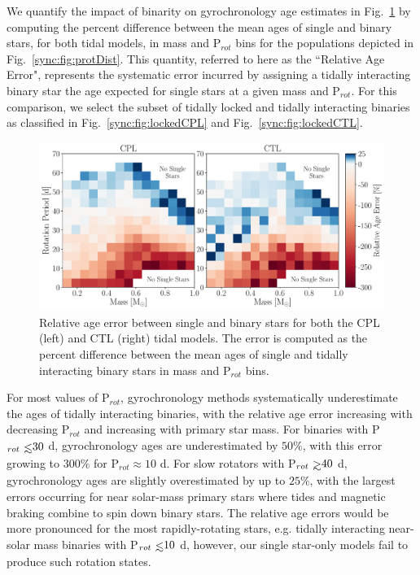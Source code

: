 We quantify the impact of binarity on gyrochronology age estimates in Fig.~\ref{sync:fig:gyro} by computing the percent difference between the mean ages of single and binary stars, for both tidal models, in mass and P$_{rot}$ bins for the populations depicted in Fig.~\ref{sync:fig:protDist}. This quantity, referred to here as the ``Relative Age Error", represents the systematic error incurred by assigning a tidally interacting binary star the age expected for single stars at a given mass and P$_{rot}$. For this comparison, we select the subset of tidally locked and tidally interacting binaries as classified in Fig.~\ref{sync:fig:lockedCPL} and Fig.~\ref{sync:fig:lockedCTL}. 

\begin{figure}
	\includegraphics[width=\columnwidth]{gyro.pdf}
   \caption{Relative age error between single and binary stars for both the CPL (left) and CTL (right) tidal models. The error is computed as the percent difference between the mean ages of single and tidally interacting binary stars in mass and P$_{rot}$ bins.}%
    \label{sync:fig:gyro}%
\end{figure}

For most values of P$_{rot}$, gyrochronology methods systematically underestimate the ages of tidally interacting binaries, with the relative age error increasing with decreasing P$_{rot}$ and increasing with primary star mass. For binaries with P$_{rot} \lsim 30$ d, gyrochronology ages are underestimated by $50\%$, with this error growing to $300\%$ for P$_{rot} \approx 10$ d. For slow rotators with P$_{rot} \gsim 40$ d, gyrochronology ages are slightly overestimated by up to $25\%$, with the largest errors occurring for near solar-mass primary stars where tides and magnetic braking combine to spin down binary stars.  The relative age errors would be more pronounced for the most rapidly-rotating stars, e.g. tidally interacting near-solar mass binaries with P$_{rot} \lsim 10$ d, however, our single star-only models fail to produce such rotation states.

